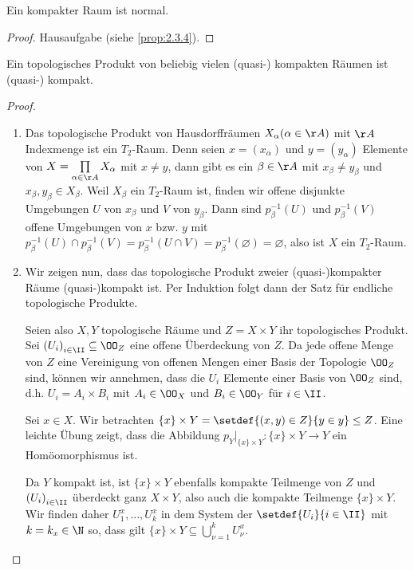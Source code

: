 \begin{prop}
\label{prop:2.3.5}
Ein kompakter Raum ist normal.\fishhere
\end{prop}
\begin{proof}
Hausaufgabe (siehe \ref{prop:2.3.4}).\qedhere
\end{proof}

\addtocounter{prop}{1}

\begin{prop}
\label{prop:2.3.7}
Ein topologisches Produkt von beliebig vielen (quasi-) kompakten Räumen ist
(quasi-) kompakt.\fishhere
\end{prop}
\begin{proof}
\begin{enumerate}[label=\arabic{*}.)]
  \item Das topologische Produkt von Hausdorffräumen $X_\alpha (\alpha\in\AA)$
  mit $\AA$ Indexmenge ist ein $T_2$-Raum. Denn seien $x=(x_\alpha)$ und
  $y=(y_\alpha)$ Elemente von $X = \prod\limits_{\alpha\in\AA} X_\alpha$ mit
  $x\neq y$, dann gibt es ein $\beta\in\AA$ mit $x_\beta\neq y_\beta$ und
  $x_\beta,y_\beta \in X_\beta$. Weil $X_\beta$ ein $T_2$-Raum ist, finden wir
  offene disjunkte Umgebungen $U$ von $x_\beta$ und $V$ von $y_\beta$. Dann
  sind $p_\beta^{-1}(U)$ und $p_\beta^{-1}(V)$ offene Umgebungen von $x$ bzw.
  $y$ mit $p_\beta^{-1}(U) \cap p_\beta^{-1}(V) = p_\beta^{-1}(U\cap V) =
  p_\beta^{-1}(\varnothing) = \varnothing$, also ist $X$ ein $T_2$-Raum.
  \item Wir zeigen nun, dass das topologische Produkt zweier (quasi-)kompakter
  Räume (quasi-)kompakt ist. Per Induktion folgt dann der Satz für endliche
  topologische Produkte.
  
  Seien also $X,Y$ topologische Räume und $Z=X\times Y$ ihr topologisches
  Produkt.
  Sei $\left(U_i\right)_{i\in\II}\subseteq \OO_Z$ eine offene Überdeckung von
  $Z$. Da jede offene Menge von $Z$ eine Vereinigung von offenen Mengen einer
  Basis der Topologie $\OO_Z$ sind, können wir annehmen, dass die $U_i$
  Elemente einer Basis von $\OO_Z$ sind, d.h. $U_i = A_i\times B_i$ mit
  $A_i\in\OO_X$ und $B_i\in\OO_Y$ für $i\in\II$.
  
  Sei $x\in X$. Wir betrachten
  $\{x\}\times Y = \setdef{(x,y)\in Z}{y\in y}\le Z$. Eine leichte Übung zeigt,
  dass die Abbildung $p_Y\big|_{\{x\}\times Y}: \{x\}\times Y\to Y$ ein
  Homöomorphismus ist.
  
  Da $Y$ kompakt ist, ist $\{x\}\times Y$ ebenfalls kompakte Teilmenge von $Z$
  und $\left(U_i\right)_{i\in\II} $ überdeckt ganz $X\times Y$, also auch die
  kompakte Teilmenge $\{x\}\times Y$. Wir finden daher $U_1^{x},\ldots,U_k^{x}$
  in dem System der $\setdef{U_i}{i\in\II}$ mit $k=k_x\in\N$ so, dass gilt
  $\{x\}\times Y\subseteq \bigcup_{\nu=1}^k U_\nu^x$.
  

\end{enumerate}
\end{proof}
